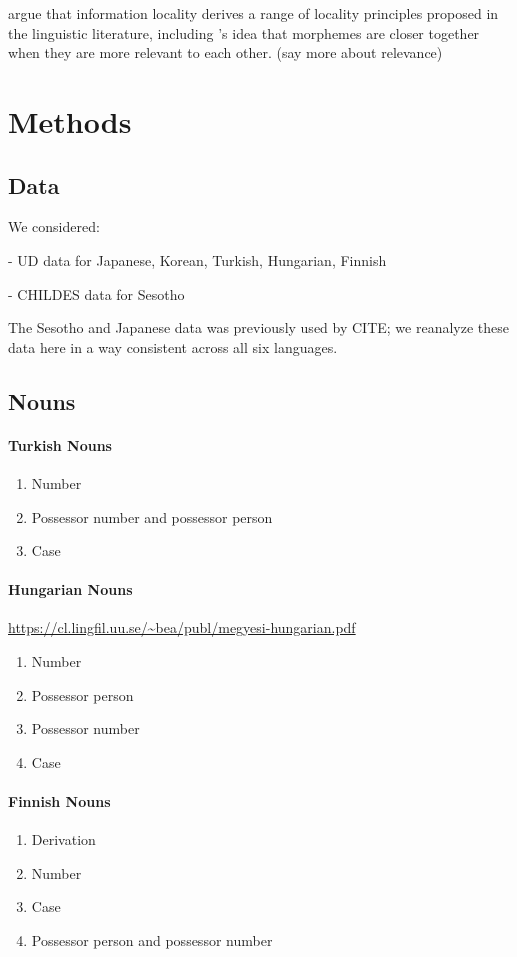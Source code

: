 \documentclass[11pt,letterpaper]{article}
\newcommand\mhahn[1]{{\color{red}(#1)}}
\begin{document}
\citet{Hahn2020modeling} argue that information locality derives a range of locality principles proposed in the linguistic literature, including \cite{bybee-morphology-1985}'s idea that morphemes are closer together when they are more relevant to each other.
\mhahn{say more about relevance}

\section{Methods}

\subsection{Data} %
We considered:

- UD data for Japanese, Korean, Turkish, Hungarian, Finnish

- CHILDES data for Sesotho

The Sesotho and Japanese data was previously used by CITE; we reanalyze these data here in a way consistent across all six languages.


\subsection{Nouns}

\paragraph{Turkish Nouns}
\begin{enumerate}
    \item Number
    \item Possessor number and possessor person
    \item Case 
\end{enumerate}

\paragraph{Hungarian Nouns}
\url{https://cl.lingfil.uu.se/~bea/publ/megyesi-hungarian.pdf}
\begin{enumerate}
    \item Number
    \item Possessor person
    \item Possessor number
    \item Case 
\end{enumerate}

\paragraph{Finnish Nouns}
\begin{enumerate}
    \item Derivation
    \item Number
    \item Case 
    \item Possessor person and possessor number
\end{enumerate}
\end{document}
